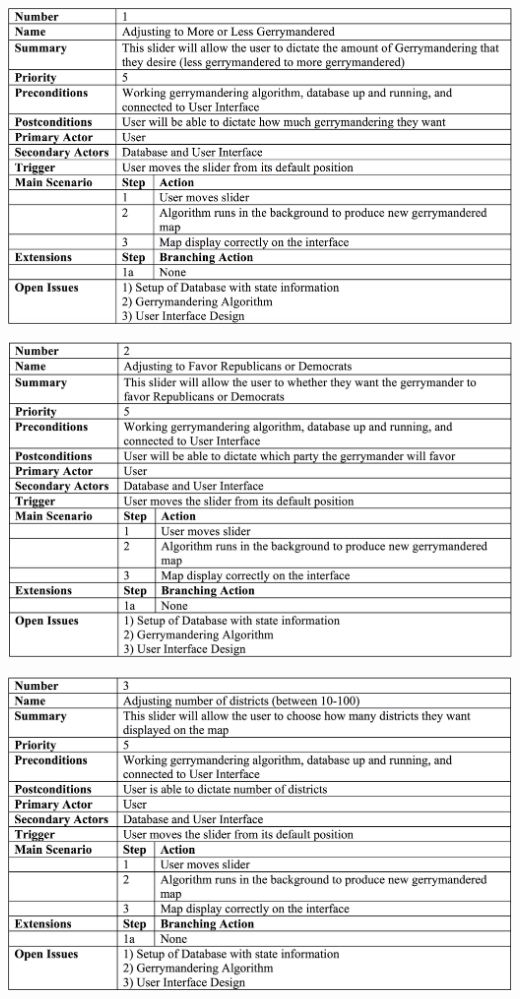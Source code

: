 \documentclass{article}
\begin{document}
\begin{addmargin}[4em]{0em}


\begin{center}
\hspace*{-2cm}      
\includegraphics[scale=.25]{Slider1.png}
\end{center}

\begin{center}
\hspace*{-2cm}      
\includegraphics[scale=.25]{Slider2.png}
\end{center}

\begin{center}
\hspace*{-2cm}      
\includegraphics[scale=.25]{Slider3.png}
\end{center}


\end{addmargin}
\end{document}
